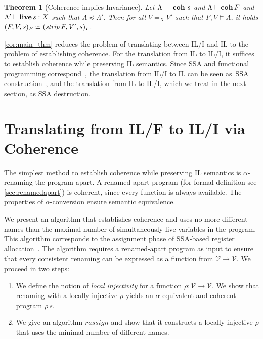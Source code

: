 \documentclass[openright,a4paper,11pt]{scrartcl}
\newcommand{\M}[1]{\ensuremath{\mathit{#1}}}
\newcommand{\Var}{\ensuremath{\mathcal{V}}}
\newcommand{\LT}{\ensuremath{\Lambda}}
\newcommand{\LC}{\ensuremath{\Lambda}}
\newcommand{\lv}{\ensuremath{X}}
\newcommand{\coh}[3]{\ensuremath{#1~\vdash\textbf{\textup{coh}}~{}#3}}
\newcommand{\cohCtx}[2]{\ensuremath{#2\vdash\textbf{\textup{coh}}\,{}#1}}
\newcommand{\agr}[3]{\ensuremath{#1,#2\models#3}}
\newcommand{\lives}[3]{\ensuremath{#1\vdash\textbf{\textup{live}}\,{}#3:#2}}
\newcommand{\myref}[1]{\autoref{#1}}
\theoremstyle{plain}
\newtheorem{theorem}{Theorem}
\theoremstyle{plain}
\theoremstyle{plain}
\theoremstyle{plain}
\theoremstyle{nonumberplain}
\begin{document}
\begin{theorem}[Coherence implies Invariance]
Let $\coh{\LT}{\lv}{s}$ and $\cohCtx{F}{\LT}$ and $\lives{\LC'}{\lv}{s}$ such that $\LT\preceq\LC'$.
Then for all $V=_{\lv}V'$ such that $\agr{F}{V}{\LT}$, it holds
$(F,V,s)_F\PrefixEq(\M{strip}\,F, V', s)_I$.
\label{cor:main_thm}
\end{theorem}
\myref{cor:main_thm} reduces the problem of translating between IL/I and IL to the problem of establishing coherence.
For the translation from IL to IL/I, it suffices to establish coherence while preserving IL semantics.
Since SSA and functional programming correspond~\cite{Kelsey:1995, DBLP:journals/sigplan/Appel98},
the translation from IL/I to IL can be seen as~SSA construction~\cite{DBLP:journals/toplas/CytronFRWZ91}, and the translation from IL to IL/I, which we treat in the next section, as SSA destruction.















\section{Translating from IL/F to IL/I via Coherence}
\label{trans:fct}
\label{sec:destr}
\label{sec:rassign}
\label{sec:il:funcoh}
 The simplest method to establish coherence while preserving IL semantics is $\alpha$-renaming the program apart.
A renamed-apart program (for formal definition see \myref{sec:renamedapart}) is coherent, since every function is always available.
The properties of $\alpha$-conversion ensure semantic equivalence.

We present an algorithm that establishes coherence and uses no more different names than the maximal number of simultaneously live variables in the program.
This algorithm corresponds to the assignment phase of SSA-based register allocation~\cite{DBLP:conf/cc/HackGG06}. The algorithm requires a renamed-apart program as input to ensure that every consistent renaming can be expressed as a function from $\Var\to\Var$.
We proceed in two steps:
\begin{enumerate}
\item We define the notion of \emph{local injectivity} for a function $\rho:\Var\to\Var$.
      We show that renaming with a locally injective $\rho$ yields an $\alpha$-equivalent and coherent program $\rho\,s$.
\item We give an algorithm $\mathit{rassign}$ and show that it constructs a locally injective $\rho$ that uses the minimal number of different names.
\end{enumerate}
\end{document}
